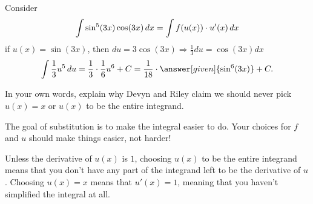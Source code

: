 \documentclass{ximera}
\begin{document}
\begin{problem}
  Consider
  \[
  \int \sin^5(3x) \cos(3x) \mathop{}\!d x = \int f(u(x)) \cdot u'(x) \mathop{}\!d x
  \]
  if $u(x) = \sin(3x)$, then $du=3\cos(3x)\Rightarrow \frac{1}{3}du=\cos(3x)dx$
  \[
  \int \frac{1}{3}u^5 \d u=\frac{1}{3}\cdot{\frac{1}{6}u^6}+C = \frac{1}{18}\cdot\answer[given]{\sin^6(3x)}+C.
  \]


\end{problem}

\begin{problem}
	In your own words, explain why Devyn and Riley claim we should never 
	pick $u(x) = x$ or $u(x)$ to be the entire integrand.
	\begin{freeResponse}
		The goal of substitution is to make the integral easier to do.  Your choices
		for $f$ and $u$ should make things easier, not harder!
	
		Unless the derivative of $u(x)$ is $1$, choosing $u(x)$ to be the entire
		integrand means that you don't have any part of the integrand left to be
		the derivative of $u$.  Choosing $u(x) = x$ means that $u'(x) = 1$, meaning
		that you haven't simplified the integral at all.  
	\end{freeResponse}
\end{problem}


\end{document}
